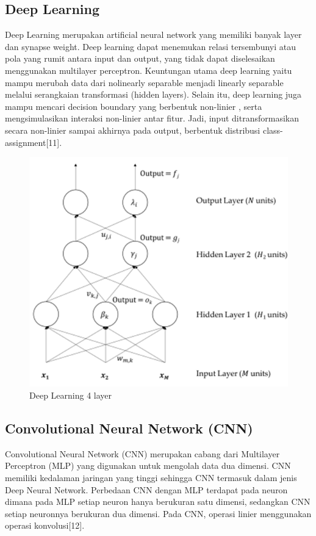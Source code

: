\subsection{Deep Learning}
 Deep Learning merupakan artificial neural network yang memiliki banyak layer dan synapse weight. 
 Deep learning dapat menemukan relasi tersembunyi atau pola yang rumit antara input dan output, yang 
 tidak dapat diselesaikan menggunakan multilayer perceptron. Keuntungan  utama  deep  learning  yaitu 
 mampu merubah data dari nolinearly separable menjadi linearly separable melalui serangkaian transformasi 
 (hidden layers). Selain itu, deep learning juga mampu mencari decision boundary yang berbentuk non-linier
 , serta mengsimulasikan interaksi non-linier antar fitur. Jadi, input ditransformasikan secara 
 non-linier sampai akhirnya pada output, berbentuk distribusi class-assignment[11].

 \begin{figure} [H] \centering
    \includegraphics[scale=0.6]{gambar/deeplearning.png}
    \caption{Deep Learning 4 layer}
    \label{fig:Deep Learning}
\end{figure}

\subsection{Convolutional Neural Network (CNN)}
Convolutional Neural Network (CNN) merupakan cabang dari Multilayer Perceptron (MLP) yang digunakan untuk
mengolah data dua dimensi. CNN memiliki kedalaman jaringan yang tinggi sehingga CNN termasuk dalam jenis
Deep Neural Network. Perbedaan CNN dengan MLP terdapat pada neuron dimana pada MLP setiap neuron hanya
berukuran satu dimensi, sedangkan CNN setiap neuronnya berukuran dua dimensi. Pada CNN, operasi linier
menggunakan operasi konvolusi[12].

